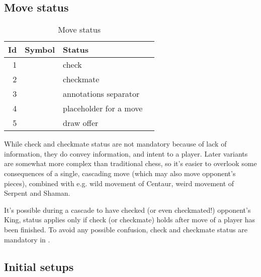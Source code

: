 \clearpage %

\subsection*{Move status}
\label{sec:Appendix/Summary/Move status}

\begin{table}[!h]
\centering
\begin{tabular}{ rlll }
\toprule
\textbf{Id} & \textbf{Symbol}      & \textbf{Status}                \\
\midrule
1           & \alg{+}              & check                          \\
2           & \alg{\#}             & checkmate                      \\ \cmidrule{1-3}
3           & \alg{\_}             & annotations separator          \\
4           & \alg{...}            & placeholder for a move         \\
5           & \alg{(=)}            & draw offer                     \\
\bottomrule
\end{tabular}
\caption{Move status}
\label{tbl:Appendix/Summary/Move status}
\end{table}

While check and checkmate status are not mandatory because of lack of information,
they do convey information, and intent to a player. Later variants are somewhat more
complex than traditional chess, so it's easier to overlook some consequences of a
single, cascading move (which may also move opponent's pieces), combined with e.g.
wild movement of Centaur, weird movement of Serpent and Shaman.

It's possible during a cascade to have checked (or even checkmated!) opponent's King,
status applies only if check (or checkmate) holds after move of a player has been
finished. To avoid any possible confusion, check and checkmate status are mandatory
in .

\clearpage %

\subsection*{Initial setups}
\label{sec:Appendix/Summary/Initial setups}

